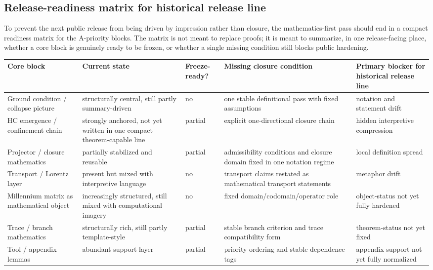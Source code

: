 \documentclass[12pt,a4paper]{article}
\DeclareRobustCommand{\QSCver}[1]{archival stage}
\renewcommand{\QSCver}[1]{historical release line}
\begin{document}
\subsection*{Release-readiness matrix for \QSCver{v2.27.0}}
To prevent the next public release from being driven by impression rather than closure, the mathematics-first pass should end in a compact readiness matrix for the A-priority blocks. The matrix is not meant to replace proofs; it is meant to summarize, in one release-facing place, whether a core block is genuinely ready to be frozen, or whether a single missing condition still blocks public hardening.

\begin{center}
{\tiny\setlength{\tabcolsep}{2.5pt}\begin{tabular}{@{}p{} P{0.14\textwidth} P{0.10\textwidth} P{0.23\textwidth} P{0.16\textwidth}@{}}
\toprule
\textbf{Core block} & \textbf{Current state} & \textbf{Freeze-ready?} & \textbf{Missing closure condition} & \textbf{Primary blocker for \QSCver{v2.27.0}}\\
\midrule
Ground condition / collapse picture & structurally central, still partly summary-driven & no & one stable definitional pass with fixed assumptions & notation and statement drift\\
HC emergence / confinement chain & strongly anchored, not yet written in one compact theorem-capable line & partial & explicit one-directional closure chain & hidden interpretive compression\\
Projector / closure mathematics & partially stabilized and reusable & partial & admissibility conditions and closure domain fixed in one notation regime & local definition spread\\
Transport / Lorentz layer & present but mixed with interpretive language & no & transport claims restated as mathematical transport statements & metaphor drift\\
Millennium matrix as mathematical object & increasingly structured, still mixed with computational imagery & no & fixed domain/codomain/operator role & object-status not yet fully hardened\\
Trace / branch mathematics & structurally rich, still partly template-style & partial & stable branch criterion and trace compatibility form & theorem-status not yet fixed\\
Tool / appendix lemmas & abundant support layer & partial & priority ordering and stable dependence tags & appendix support not yet fully normalized\\
\bottomrule
\end{tabular}}
\end{center}
\end{document}
